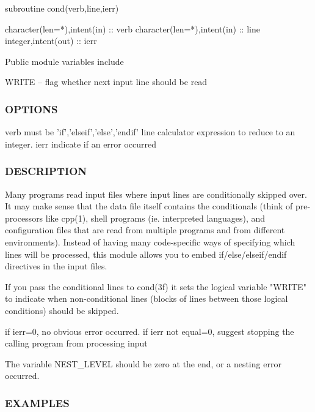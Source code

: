\begin{DoxyVerb} subroutine cond(verb,line,ierr)

  character(len=*),intent(in) :: verb
  character(len=*),intent(in) :: line
  integer,intent(out)         :: ierr

 Public module variables include

  WRITE -- flag whether next input line should be read
\end{DoxyVerb}


\subsubsection*{O\+P\+T\+I\+O\+NS}

\begin{DoxyVerb}  verb      must be 'if','elseif','else','endif'
  line      calculator expression to reduce to an integer.
  ierr      indicate if an error occurred
\end{DoxyVerb}


\subsubsection*{D\+E\+S\+C\+R\+I\+P\+T\+I\+ON}

\begin{DoxyVerb} Many programs read input files where input lines are conditionally skipped over. It may make sense that the data file itself
 contains the conditionals (think of pre-processors like cpp(1), shell programs (ie. interpreted languages), and configuration
 files that are read from multiple programs and from different environments). Instead of having many code-specific ways of
 specifying which lines will be processed, this module allows you to embed if/else/elseif/endif directives in the input files.

 If you pass the conditional lines to cond(3f) it sets the logical variable "WRITE" to indicate when non-conditional lines
 (blocks of lines between those logical conditions) should be skipped.

 if ierr=0, no obvious error occurred. if ierr not equal=0, suggest stopping the calling program from processing input

 The variable NEST_LEVEL should be zero at the end, or a nesting error occurred.
\end{DoxyVerb}


\subsubsection*{E\+X\+A\+M\+P\+L\+ES}

